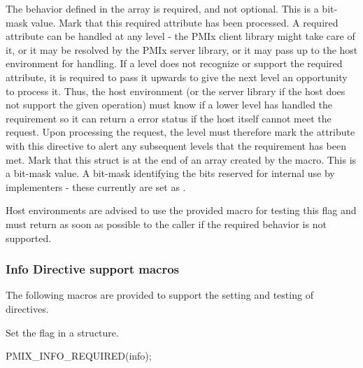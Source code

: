 \begin{constantdesc}
%
The behavior defined in the  array is required, and not optional. This is a bit-mask value.
%
Mark that this required attribute has been processed. A required attribute can be handled at any level - the \ac{PMIx} client library might take care of it, or it may be resolved by the \ac{PMIx} server library, or it may pass up to the host environment for handling. If a level does not recognize or support the required attribute, it is required to pass it upwards to give the next level an opportunity to process it. Thus, the host environment (or the server library if the host does not support the given operation) must know if a lower level has handled the requirement so it can return a  error status if the host itself cannot meet the request. Upon processing the request, the level must therefore mark the attribute with this directive to alert any subsequent levels that the requirement has been met.
%
Mark that this  struct is at the end of an array created by the  macro. This is a bit-mask value.
%
A bit-mask identifying the bits reserved for internal use by implementers - these currently are set as .
%
\end{constantdesc}

\advicermstart
Host environments are advised to use the provided  macro for testing this flag and must return  as soon as possible to the caller if the required behavior is not supported.
\advicermend


\subsubsection{Info Directive support macros}

The following macros are provided to support the setting and testing of  directives.


Set the  flag in a  structure.

\cspecificstart
\begin{codepar}
PMIX_INFO_REQUIRED(info);
\end{codepar}
\cspecificend

